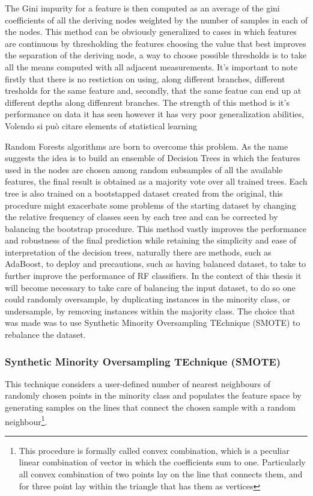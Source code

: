 The Gini impurity for a feature is then computed as an average of the gini coefficients of all the deriving nodes weighted by the number of samples in each of the nodes.  This method can be obviously generalized to cases in which features are continuous by thresholding the features choosing the value that best improves the separation of the deriving node, a way to choose possible thresholds is to take all the means computed with all adjacent measurements. It's important to note firstly that there is no restiction on using, along different branches, different tresholds for the same feature and, secondly, that the same featue can end up at different depths along diffenrent branches. The strength of this method is it's performance on data it has seen however it has very poor generalization abilities, \large{Volendo si può citare elements of statistical learning}\newline

Random Forests algorithms are born to overcome this problem. As the name suggests the idea is to build an ensemble of Decision Trees in which the features used in the nodes are chosen among random subsamples of all the available features, the final result is obtained as a majority vote over all trained trees. Each tree is also trained on a bootstapped dataset created from the original, this procedure might exacerbate some problems of the starting dataset by changing the relative frequency of classes seen by each tree and can be corrected by balancing the bootstrap procedure.
This method vastly improves the performance and robustness of the final prediction while retaining the simplicity and ease of interpretation of the decision trees, naturally there are methods, such as AdaBoost, to deploy and precautions, such as having balanced dataset, to take to further improve the performance of RF classifiers.
In the context of this thesis it will become necessary to take care of balancing the input dataset, to do so one could randomly oversample, by duplicating instances in the minority class, or undersample, by removing instances within the majority class. The choice that was made was to use Synthetic Minority Oversampling TEchnique (SMOTE)\cite{SMOTE} to rebalance the dataset.

\subsubsection{Synthetic Minority Oversampling TEchnique (SMOTE)}
This technique considers a user-defined number of nearest neighbours of randomly chosen points in the minority class and populates the feature space by generating samples on the lines that connect the chosen sample with a random neighbour\footnote{This procedure is formally called convex combination, which is a peculiar linear combination of vector in which the coefficients sum to one. Particularly all convex combination of two points lay on the line that connects them, and for three point lay within the triangle that has them as vertices}. 


